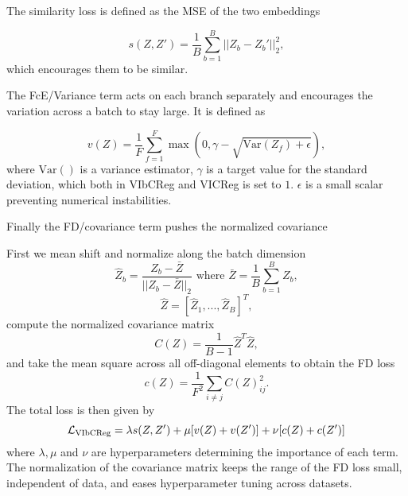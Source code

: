 \documentclass[../../thesis.tex]{subfiles}
\begin{document}
The similarity loss is defined as the MSE of the two embeddings

\begin{equation}
    s(Z,Z') = \frac{1}{B} \sum_{b=1}^B || Z_b-Z_b'||_2^2,
\end{equation}
which encourages them to be similar. 

The FcE/Variance term acts on each branch separately and encourages the variation across a batch to stay large. It is defined as 


\begin{equation}
    v(Z) =  \frac{1}{F} \sum_{f=1}^F \max(0,\gamma - \sqrt{\text{Var}(Z_f)+\epsilon}),
\end{equation}
where $\text{Var}()$ is a variance estimator, $\gamma$ is a target value for the standard deviation, which both in VIbCReg and VICReg is set to $1$. $\epsilon$ is a small scalar preventing numerical instabilities.  \newline 

Finally the FD/covariance term pushes the normalized covariance 

First we mean shift and normalize along the batch dimension
\begin{equation}
    \widehat{Z}_b = \frac{Z_b-\bar{Z}}{||Z_b-\bar{Z}||_2} \text{ where }  \bar{Z} = \frac{1}{B}\sum_{b=1}^B  Z_b,
\end{equation}
\begin{equation}
    \widehat{Z} = [\widehat{Z}_1,...,\widehat{Z}_B]^T,
\end{equation}
compute the normalized covariance matrix
\begin{equation}
    C(Z) = \frac{1}{B-1}\widehat{Z}^T \widehat{Z},
\end{equation}
and take the mean square across all off-diagonal elements to obtain the FD loss
\begin{equation}
    c(Z) = \frac{1}{F^2}\sum_{i\neq j} C(Z)_{ij}^2.
\end{equation}
The total loss is then given by
\begin{equation}
    \mathcal{L}_\text{VIbCReg} = \lambda s(Z,Z') + \mu [v(Z) + v(Z')] + \nu[c(Z)+c(Z')]
\end{equation}
where $\lambda, \mu$ and $\nu$ are hyperparameters determining the importance of each term. The normalization of the covariance matrix keeps the range of the FD loss small, independent of data, and eases hyperparameter tuning across datasets.
\end{document}
